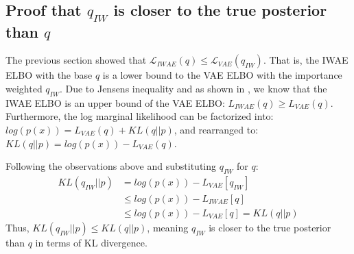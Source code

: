 \documentclass{article} %
\begin{document}



\subsection{Proof that \texorpdfstring{$q_{IW}$}{} is closer to the true posterior than \texorpdfstring{$q$}{}}

The previous section showed that $\mathcal{L}_{IWAE}(q) \leq \mathcal{L}_{VAE}(q_{IW})$. That is, the IWAE ELBO with the base $q$ is a lower bound to the VAE ELBO with the importance weighted $q_{IW}$. Due to Jensen\textquotesingle s inequality and as shown in \cite{burda2015importance}, we know that the IWAE ELBO is an upper bound of the VAE ELBO: ${L}_{IWAE}(q) \geq {L}_{VAE}(q)$. Furthermore, the log marginal likelihood can be factorized into: $log(p(x)) = {L}_{VAE}(q) + KL(q||p)$, and rearranged to: $KL(q||p) = log(p(x)) - {L}_{VAE}(q)$.

Following the observations above and substituting $q_{IW}$ for $q$:
\begin{align} 
    KL(q_{IW}||p) &= log(p(x)) - {L}_{VAE}[q_{IW}] \\
    &\leq log(p(x)) - {L}_{IWAE}[q] \\
    &\leq log(p(x)) - {L}_{VAE}[q] = KL(q||p)
\end{align}
Thus, $KL(q_{IW}||p) \leq KL(q||p)$, meaning $q_{IW}$ is closer to the true posterior than $q$ in terms of KL divergence. 
\end{document}
